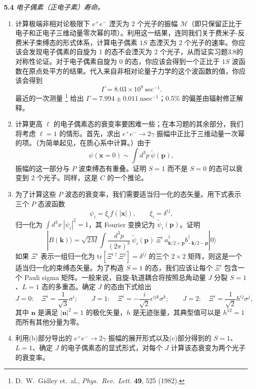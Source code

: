 \textbf{5.4} \emph{电子偶素（正电子素）寿命。}
\begin{enumerate}[label=(\alph*)]
  \item 计算极端非相对论极限下 $e^{+}e^{-}$ 湮灭为 2 个光子的振幅 $\mathcal{M}$（即只保留正比于电子和正电子三维动量零次幂的项）。利用这一结果，连同我们关于费米子-反费米子束缚态的形式体系，计算电子偶素 $1S$ 态湮灭为 2 个光子的速率。你应该会发现电子偶素的自旋为 1 的态不会湮灭为 2 个光子，从而证实习题3.8的对称性论证。对于电子偶素自旋为 0 的态，你应该会得到一个正比于 $1S$ 波函数在原点处平方的结果。代入来自非相对论量子力学的这个波函数的值，你应该会得到
    \begin{equation}
      \Gamma = 8.03\times10^9\ \mathrm{sec}^{-1} .
    \end{equation}
    最近的一次测量%
    \footnote{D.~W.~Gidley et.\ al., \emph{Phys.\ Rev.\ Lett.} \textbf{49}, 525
    (1982).} 给出 $\Gamma = 7.994 \pm 0.011\ \mathrm{nsec}^{-1}$；0.5\% 的偏差由辐射修正解释。
  \item 计算更高 $\ell$ 的电子偶素态的衰变率要困难一些；在本习题的其余部分，我们将考虑 $\ell = 1$ 的情形。首先，求出 $e^{+}e^{-}\to 2\gamma$ 振幅中正比于三维动量一次幂的项。（为简单起见，在质心系中计算。）由于
    \begin{equation}
      \psi(\mathbf{x}=0) \sim \int d^3p\ \tilde{\psi}(\mathbf{p}),
    \end{equation}
    振幅的这一部分与 $P$ 波束缚态有重叠。证明 $S=1$ 而不是 $S=0$ 的态可以衰变到 2 个光子。同样，这是 $C$ 的一个推论。
  \item 为了计算这些 $P$ 波态的衰变率，我们需要适当归一化的态矢量。用下式表示三个 $P$ 态波函数
    \begin{equation}
      \psi_i = \xi_i f(|\mathbf{x}|),\qquad \xi_i = \delta^{ij},
    \end{equation}
    归一化为 $\int d^3x\ |\psi_i|^2 = 1$，其 Fourier 变换记为 $\tilde{\psi}_i(\mathbf{p})$。证明
    \begin{equation}
      |B(\mathbf{k})\rangle = \sqrt{2M}\int \frac{d^3p}{(2\pi)^3}\
        \tilde{\psi}_i(\mathbf{p})\ \Xi^i\ a^{\dagger}_{\mathbf{k}/2+\mathbf{p}}
        b^{\dagger}_{-\mathbf{k}/2-\mathbf{p}}|0\rangle
    \end{equation}
    如果 $\Xi^i$ 表示一组归一化为 $\mathrm{tr}[\Xi^{i\dagger}\Xi^j] = \delta^{ij}$ 的三个 $2\times2$ 矩阵，则这是一个适当归一化的束缚态矢量。为了构造 $S=1$ 的态，我们应该让每个 $\Xi^i$ 包含一个 Pauli sigma 矩阵。一般来说，自旋-轨道耦合将按照总角动量 $J$ 分裂 $S=1$、$L=1$ 态的多重态。确定 $J$ 的态由下式给出
    \begin{equation}
      J = 0:\quad \Xi^i = \frac{1}{\sqrt{3}}\sigma^i;\qquad
      J = 1:\quad \Xi^i = -\frac{i}{\sqrt{2}}\epsilon^{ijk}\sigma^k;\qquad
      J = 2:\quad \Xi^i = \frac{1}{\sqrt{2}}h^{ij}\sigma^j,
    \end{equation}
    其中 $\mathbf{n}$ 是满足 $|\mathbf{n}|^2 = 1$ 的极化矢量，$h$ 是无迹张量，其典型值可以是 $h^{12} = 1$ 而所有其他分量为零。
  \item 利用(b)部分导出的 $e^{+}e^{-}\to 2\gamma$ 振幅的展开形式以及(c)部分得到的 $S=1$、$L=1$、确定 $J$ 的电子偶素态的显式形式，对每个 $J$ 计算该态衰变为两个光子的衰变率。
\end{enumerate}
